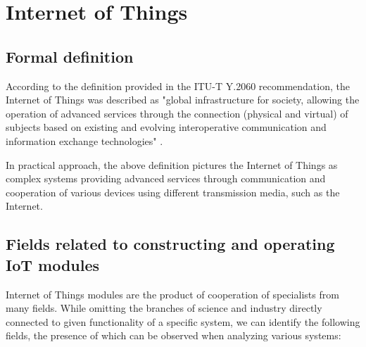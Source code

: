 \chapter{Internet of Things}

\section{Formal definition}
According to the definition provided in the ITU-T Y.2060 recommendation, the Internet of Things was described as "global infrastructure for society, allowing the operation of advanced services through the connection (physical and virtual) of subjects based on existing and evolving interoperative communication and information exchange technologies" \cite{itu:iot}.

In practical approach, the above definition pictures the Internet of Things as complex systems providing advanced services through communication and cooperation of various devices using different transmission media, such as the Internet.

\section{Fields related to constructing and operating IoT modules}
Internet of Things modules are the product of cooperation of specialists from many fields. While omitting the branches of science and industry directly connected to given functionality of a specific system, we can identify the following fields, the presence of which can be observed when analyzing various systems:

